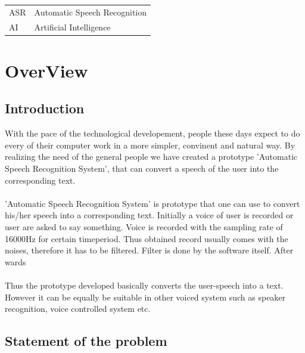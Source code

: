 \documentclass[a4paper,12pt,onepage]{article}
\begin{document}
\begin{tabular}{l l}
  ASR & Automatic Speech Recognition \\
  AI & Artificial Intelligence \\
\end{tabular}

\cleardoublepage
{}
\section{OverView}

\subsection{Introduction}
 With the pace of the technological developement, people these days expect to do every of their computer work in a more simpler, convinent and natural way. By realizing the need of the general people we have created a prototype 
'Automatic Speech Recognition System', that can convert a speech of the user into the corresponding text.
\\
\\
'Automatic Speech Recognition System' is prototype that one can use to convert his/her speech into a corresponding text. Initially a voice of user is recorded or user are asked to say something. Voice is recorded with the sampling rate of 16000Hz for certain timeperiod. Thus obtained record 
usually comes with the noises, therefore it has to be filtered. Filter is done by the software itself. After wards
\\
\\
Thus the prototype developed basically converts the user-speech into a text. However it can be equally be suitable in other voiced system such as 
speaker recognition, voice controlled system etc.
\newpage
\subsection{Statement of the problem}

\newpage
\end{document}
